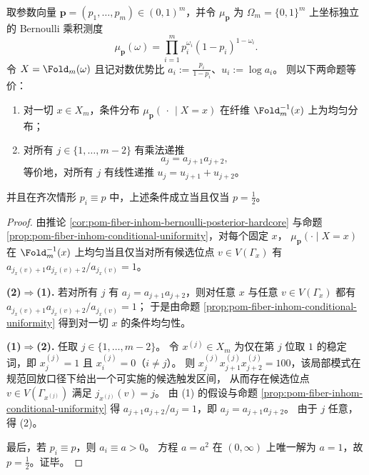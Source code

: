 \begin{theorem}[全纤维后验均匀化的乘积源充要刻画]\label{thm:pom-fiber-full-posterior-uniformization-product-source}
取参数向量 \(\boldsymbol p=(p_1,\dots,p_m)\in(0,1)^m\)，并令 \(\mu_{\boldsymbol p}\) 为 \(\Omega_m=\{0,1\}^m\) 上坐标独立的 Bernoulli 乘积测度
\[
\mu_{\boldsymbol p}(\omega)=\prod_{i=1}^{m}p_i^{\omega_i}(1-p_i)^{1-\omega_i}.
\]
令 \(X=\Fold_m(\omega)\) 且记对数优势比 \(a_i:=\frac{p_i}{1-p_i}\)、\(u_i:=\log a_i\)。
则以下两命题等价：
\begin{enumerate}
  \item 对一切 \(x\in X_m\)，条件分布 \(\mu_{\boldsymbol p}(\,\cdot\,\mid X=x)\) 在纤维 \(\Fold_m^{-1}(x)\) 上为均匀分布；
  \item 对所有 \(j\in\{1,\dots,m-2\}\) 有乘法递推
  \[
  a_j=a_{j+1}a_{j+2},
  \]
  等价地，对所有 \(j\) 有线性递推 \(u_j=u_{j+1}+u_{j+2}\)。
\end{enumerate}
并且在齐次情形 \(p_i\equiv p\) 中，上述条件成立当且仅当 \(p=\tfrac12\)。
\end{theorem}
\begin{proof}
由推论 \ref{cor:pom-fiber-inhom-bernoulli-posterior-hardcore} 与命题 \ref{prop:pom-fiber-inhom-conditional-uniformity}，对每个固定 \(x\)，
\(\mu_{\boldsymbol p}(\cdot\mid X=x)\) 在 \(\Fold_m^{-1}(x)\) 上均匀当且仅当对所有候选位点 \(v\in V(\Gamma_x)\) 有
\(
a_{j_x(v)+1}a_{j_x(v)+2}/a_{j_x(v)}=1
\)。
\par
\textbf{(2)\(\Rightarrow\)(1).}
若对所有 \(j\) 有 \(a_j=a_{j+1}a_{j+2}\)，则对任意 \(x\) 与任意 \(v\in V(\Gamma_x)\) 都有
\(
a_{j_x(v)+1}a_{j_x(v)+2}/a_{j_x(v)}=1
\)；
于是由命题 \ref{prop:pom-fiber-inhom-conditional-uniformity} 得到对一切 \(x\) 的条件均匀性。
\par
\textbf{(1)\(\Rightarrow\)(2).}
任取 \(j\in\{1,\dots,m-2\}\)。
令 \(x^{(j)}\in X_m\) 为仅在第 \(j\) 位取 \(1\) 的稳定词，即 \(x^{(j)}_j=1\) 且 \(x^{(j)}_i=0\)（\(i\neq j\)）。
则 \(x^{(j)}_jx^{(j)}_{j+1}x^{(j)}_{j+2}=100\)，该局部模式在规范回放口径下给出一个可实施的候选触发区间，
从而存在候选位点 \(v\in V(\Gamma_{x^{(j)}})\) 满足 \(j_{x^{(j)}}(v)=j\)。
由 (1) 的假设与命题 \ref{prop:pom-fiber-inhom-conditional-uniformity} 得
\(
a_{j+1}a_{j+2}/a_j=1
\)，即 \(a_j=a_{j+1}a_{j+2}\)。
由于 \(j\) 任意，得 (2)。
\par
最后，若 \(p_i\equiv p\)，则 \(a_i\equiv a>0\)。
方程 \(a=a^2\) 在 \((0,\infty)\) 上唯一解为 \(a=1\)，故 \(p=\tfrac12\)。证毕。
\end{proof}

\endinput
